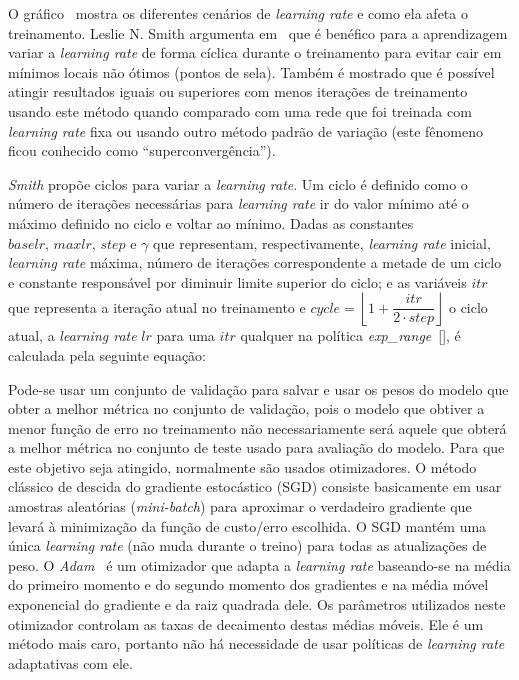 O gráfico~ mostra os diferentes cenários de \textit{learning rate} e como ela afeta o treinamento.
Leslie N. Smith argumenta em~\cite{smith2017cyclical} que é benéfico para a aprendizagem variar a \textit{learning rate} de forma cíclica durante o treinamento para evitar cair em mínimos locais não ótimos (pontos de sela). Também é mostrado que é possível atingir resultados iguais ou superiores com menos iterações de treinamento usando este método quando comparado com uma rede que foi treinada com \textit{learning rate} fixa ou usando outro método padrão de variação (este fênomeno ficou conhecido como ``superconvergência'').

\textit{Smith} propõe ciclos para variar a \textit{learning rate}. Um ciclo é definido como o número de iterações necessárias para \textit{learning rate} ir do valor mínimo até o máximo definido no ciclo e voltar ao mínimo. Dadas as constantes $baselr,\, maxlr,\, step \text{ e } \gamma$ que representam, respectivamente, \textit{learning rate} inicial, \textit{learning rate} máxima, número de iterações correspondente a metade de um ciclo e constante responsável por diminuir limite superior do ciclo; e as variáveis $itr$ que representa a iteração atual no treinamento e $cycle = \left\lfloor1 + \dfrac{itr}{2 \cdot step}\right\rfloor$ o ciclo atual, a \textit{learning rate} $lr$ para uma $itr$ qualquer na política \textit{exp\_range}~[], é calculada pela seguinte equação:

Pode-se usar um conjunto de validação para salvar e usar os pesos do modelo que obter a melhor métrica no conjunto de validação, pois o modelo que obtiver a menor função de erro no treinamento não necessariamente será aquele que obterá a melhor métrica no conjunto de teste usado para avaliação do modelo. Para que este objetivo seja atingido, normalmente são usados otimizadores. O método clássico de descida do gradiente estocástico (\acrshort{SGD}) consiste basicamente em usar amostras aleatórias (\textit{mini-batch}) para aproximar o verdadeiro gradiente que levará à minimização da função de custo/erro escolhida. O \acrshort{SGD} mantém uma única \textit{learning rate} (não muda durante o treino) para todas as atualizações de peso. O \textit{Adam}~\cite{kingma2014adam} é um otimizador que adapta a \textit{learning rate} baseando-se na média do primeiro momento e do segundo momento dos gradientes e na média móvel exponencial do gradiente e da raiz quadrada dele. Os parâmetros utilizados neste otimizador controlam as taxas de decaimento destas médias móveis. Ele é um método mais caro, portanto não há necessidade de usar políticas de \textit{learning rate} adaptativas com ele.
